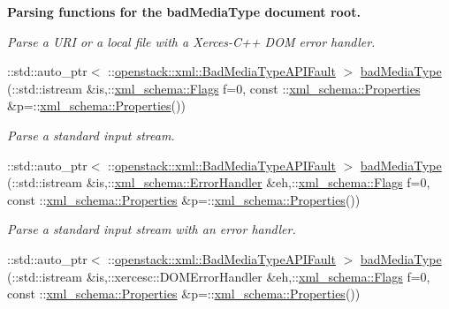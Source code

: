 \begin{Indent}{\bf Parsing functions for the badMediaType document root.}
\begin{DoxyCompactItemize}
\begin{DoxyCompactList}\small\item\em Parse a URI or a local file with a Xerces-\/C++ DOM error handler. \item\end{DoxyCompactList}\item 
::std::auto\_\-ptr$<$ ::\hyperlink{classopenstack_1_1xml_1_1BadMediaTypeAPIFault}{openstack::xml::BadMediaTypeAPIFault} $>$ \hyperlink{namespaceopenstack_1_1xml_a9c5d9540080f90e22af836afb6d44de9}{badMediaType} (::std::istream \&is,::\hyperlink{namespacexml__schema_affb4c227cbd9aa7453dd1dc5a1401943}{xml\_\-schema::Flags} f=0, const ::\hyperlink{namespacexml__schema_ad27ce19a7ee1d3b1064092648898f64c}{xml\_\-schema::Properties} \&p=::\hyperlink{namespacexml__schema_ad27ce19a7ee1d3b1064092648898f64c}{xml\_\-schema::Properties}())
\begin{DoxyCompactList}\small\item\em Parse a standard input stream. \item\end{DoxyCompactList}\item 
::std::auto\_\-ptr$<$ ::\hyperlink{classopenstack_1_1xml_1_1BadMediaTypeAPIFault}{openstack::xml::BadMediaTypeAPIFault} $>$ \hyperlink{namespaceopenstack_1_1xml_a50341a9a938548fc25154eacceaaabeb}{badMediaType} (::std::istream \&is,::\hyperlink{namespacexml__schema_ab1c9361bfd3b404eaabf0c31eded79dc}{xml\_\-schema::ErrorHandler} \&eh,::\hyperlink{namespacexml__schema_affb4c227cbd9aa7453dd1dc5a1401943}{xml\_\-schema::Flags} f=0, const ::\hyperlink{namespacexml__schema_ad27ce19a7ee1d3b1064092648898f64c}{xml\_\-schema::Properties} \&p=::\hyperlink{namespacexml__schema_ad27ce19a7ee1d3b1064092648898f64c}{xml\_\-schema::Properties}())
\begin{DoxyCompactList}\small\item\em Parse a standard input stream with an error handler. \item\end{DoxyCompactList}\item 
::std::auto\_\-ptr$<$ ::\hyperlink{classopenstack_1_1xml_1_1BadMediaTypeAPIFault}{openstack::xml::BadMediaTypeAPIFault} $>$ \hyperlink{namespaceopenstack_1_1xml_a3bb62ef80565fb4d3a8214c03f9cb581}{badMediaType} (::std::istream \&is,::xercesc::DOMErrorHandler \&eh,::\hyperlink{namespacexml__schema_affb4c227cbd9aa7453dd1dc5a1401943}{xml\_\-schema::Flags} f=0, const ::\hyperlink{namespacexml__schema_ad27ce19a7ee1d3b1064092648898f64c}{xml\_\-schema::Properties} \&p=::\hyperlink{namespacexml__schema_ad27ce19a7ee1d3b1064092648898f64c}{xml\_\-schema::Properties}())

\end{DoxyCompactItemize}
\end{Indent}
